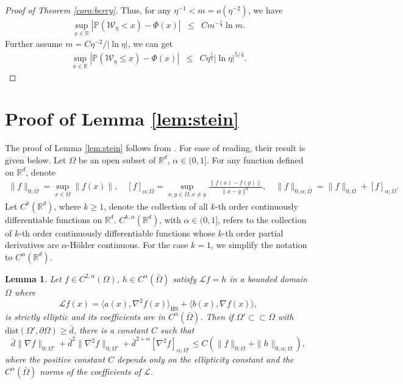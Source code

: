 \documentclass[12pt]{amsart}
\newtheorem{lemma}[theorem]{Lemma}
\theoremstyle{definition}
\theoremstyle{remark}
\numberwithin{equation}{section}
\newcommand{\Ll}{\langle}
\newcommand{\Rr}{\rangle}
\newcommand{\R}{\mathbb{R}}\newcommand{\RR}{\mathbb{R}}
\newcommand{\PP}{\mathbb{P}}
\begin{document}
\begin{proof}[Proof of Theorem \ref{coro:berry}]
Thus, for any $\eta^{-1}<m=o(\eta^{-2})$, we have
\begin{eqnarray*}
	\sup_{x\in\R}|\PP(\mathcal{W}_\eta< x)-\Phi(x)|&\le& Cm^{-\frac14}\ln m.
\end{eqnarray*}		
Further assume $m=C\eta^{-2}/|\ln\eta|$, we can get
\begin{eqnarray*}
	\sup_{x\in\R}|\PP(\mathcal{W}_\eta\le x)-\Phi(x)|
	&\le& C\eta^{\frac12}|\ln \eta|^{5/4}.
\end{eqnarray*}	
\end{proof}	

\section{Proof of Lemma \ref{lem:stein}}\label{appen:regularity}

The proof of Lemma \ref{lem:stein} follows from \cite[Corollary 6.3]{gilbarg2001elliptic}. For ease of reading, their result is given below. Let $\Omega$ be an open subset of $\R^d$, $\alpha\in(0,1]$. For any function defined on $\R^d$, denote
\begin{eqnarray*}
	\|f\|_{0;\Omega}=\sup_{x\in\Omega}\|f(x)\|,
	\quad [f]_{\alpha;\Omega}=\sup_{x,y\in\Omega, x\neq y}\frac{\|f(x)-f(y)\|}{\|x-y\|^\alpha},
	\quad \|f\|_{0, \alpha;\Omega}=\|f\|_{0;\Omega}+[f]_{\alpha;\Omega}.
\end{eqnarray*}
Let $C^{k}(\R^d)$, where $k \ge1$, denote the collection of all $k$-th order continuously differentiable functions on $\R^d$. $C^{k,\alpha}(\R^d)$, with $\alpha\in(0,1]$, refers to the collection of $k$-th order continuously differentiable functions whose $k$-th order partial derivatives are $\alpha$-H\"older continuous. For the case $k=1$, we simplify the notation to $C^{\alpha}(\R^d)$.

\begin{lemma}{\cite[Corollary 6.3]{gilbarg2001elliptic}}\label{lem:gilbarg}
	Let $f\in C^{2,\alpha}(\Omega)$, $h \in C^{\alpha}(\bar{\Omega})$ satisfy $\mathcal{L}f=h$ in a bounded domain $\Omega$ where 
	\begin{equation*}
		\mathcal{L}f(x)=\Ll a(x), \nabla^2 f(x) \Rr_\mathrm{HS}+\Ll b(x),\nabla f(x)\Rr,
	\end{equation*}
	is strictly elliptic and its coefficients are in $ C^{\alpha}(\bar{\Omega})$. Then if $ \Omega' \subset \subset \Omega$ with $\text{dist}(\Omega', \partial \Omega) \geq \bar d$, there is a constant $ C $ such that
	\begin{equation}\label{e:regularity5}
		\bar d \| \nabla f \|_{0; \Omega'} + \bar d^2 \| \nabla^2 f \|_{0; \Omega'} + \bar d^{2+\alpha} [ \nabla^2 f ]_{\alpha; \Omega'} \leq C ( \| f \|_{0; \Omega} + \|h \|_{0, \alpha; \Omega}),
	\end{equation}
	where the positive constant  $C$  depends only on the ellipticity constant and the $ C^{\alpha}(\bar{\Omega}) $ norms of the coefficients of $\mathcal{L}$.
\end{lemma}
\end{document}
